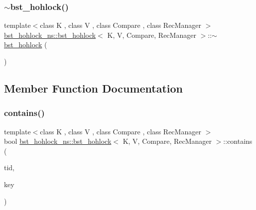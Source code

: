 \mbox{\label{classbst__hohlock__ns_1_1bst__hohlock_ac0f677db92933f5dffcb2e6726065e90}} 
\subsubsection{\texorpdfstring{$\sim$bst\+\_\+hohlock()}{~bst\_hohlock()}}
{\footnotesize\ttfamily template$<$class K , class V , class Compare , class Rec\+Manager $>$ \\
\hyperlink{classbst__hohlock__ns_1_1bst__hohlock}{bst\+\_\+hohlock\+\_\+ns\+::bst\+\_\+hohlock}$<$ K, V, Compare, Rec\+Manager $>$\+::$\sim$\hyperlink{classbst__hohlock__ns_1_1bst__hohlock}{bst\+\_\+hohlock} (\begin{DoxyParamCaption}{ }\end{DoxyParamCaption})\hspace{0.3cm}{\ttfamily [inline]}}



\subsection{Member Function Documentation}
\mbox{\label{classbst__hohlock__ns_1_1bst__hohlock_a433df8bf5bede3cd7742479958138cc5}} 
\subsubsection{\texorpdfstring{contains()}{contains()}}
{\footnotesize\ttfamily template$<$class K , class V , class Compare , class Rec\+Manager $>$ \\
bool \hyperlink{classbst__hohlock__ns_1_1bst__hohlock}{bst\+\_\+hohlock\+\_\+ns\+::bst\+\_\+hohlock}$<$ K, V, Compare, Rec\+Manager $>$\+::contains (\begin{DoxyParamCaption}\item[{const int}]{tid,  }\item[{const K \&}]{key }\end{DoxyParamCaption})\hspace{0.3cm}{\ttfamily [inline]}}

